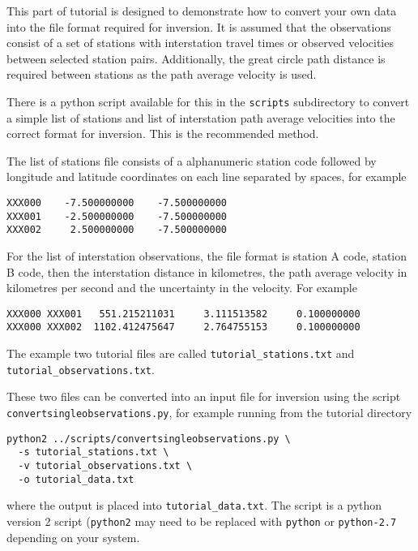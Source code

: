 \documentclass[a4paper,12pt]{article}
\begin{document}
This part of tutorial is designed to demonstrate how to convert your
own data into the file format required for inversion. It is assumed
that the observations consist of a set of stations with interstation
travel times or observed velocities between selected station
pairs. Additionally, the great circle path distance is required between
stations as the path average velocity is used.

There is a python script available for this in the {\tt scripts}
subdirectory to convert a simple list of stations and list of interstation
path average velocities into the correct format for inversion. This
is the recommended method.

The list of stations file consists of a alphanumeric station code
followed by longitude and latitude coordinates on each line separated
by spaces, for example

\begin{verbatim}
XXX000    -7.500000000    -7.500000000
XXX001    -2.500000000    -7.500000000
XXX002     2.500000000    -7.500000000
\end{verbatim}

For the list of interstation observations, the file format is
station A code, station B code, then the interstation distance in
kilometres, the path average velocity in kilometres per second
and the uncertainty in the velocity. For example

\begin{verbatim}
XXX000 XXX001   551.215211031     3.111513582     0.100000000
XXX000 XXX002  1102.412475647     2.764755153     0.100000000
\end{verbatim}

The example two tutorial files are called {\tt tutorial\_stations.txt}
and {\tt tutorial\_observations.txt}.

These two files can be converted into an input file for inversion
using the script {\tt convertsingleobservations.py}, for example
running from the tutorial directory

\begin{verbatim}
python2 ../scripts/convertsingleobservations.py \
  -s tutorial_stations.txt \
  -v tutorial_observations.txt \
  -o tutorial_data.txt
\end{verbatim}

where the output is placed into {\tt tutorial\_data.txt}. The script is
a python version 2 script ({\tt python2} may need to be replaced with {\tt python} or {\tt python-2.7}
depending on your system.
\end{document}
